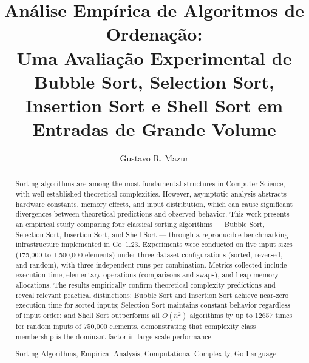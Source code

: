 \documentclass[12pt]{article}
\title{Análise Empírica de Algoritmos de Ordenação:\\
       Uma Avaliação Experimental de Bubble Sort, Selection Sort,\\
       Insertion Sort e Shell Sort em Entradas de Grande Volume}
\author{Gustavo R. Mazur\inst{1}}
\newcommand{\num}[1]{#1}
\begin{document}
\maketitle

\begin{abstract}
Sorting algorithms are among the most fundamental structures in
Computer Science, with well-established theoretical complexities.
However, asymptotic analysis abstracts hardware constants, memory
effects, and input distribution, which can cause significant
divergences between theoretical predictions and observed behavior.
This work presents an empirical study comparing four classical
sorting algorithms — Bubble Sort, Selection Sort, Insertion Sort,
and Shell Sort — through a reproducible benchmarking infrastructure
implemented in Go~1.23. Experiments were conducted on five input
sizes (175,000 to 1,500,000 elements) under three dataset
configurations (sorted, reversed, and random), with three
independent runs per combination. Metrics collected include
execution time, elementary operations (comparisons and swaps),
and heap memory allocations. The results empirically confirm
theoretical complexity predictions and reveal relevant practical
distinctions: Bubble Sort and Insertion Sort achieve near-zero
execution time for sorted inputs; Selection Sort maintains
constant behavior regardless of input order; and Shell Sort
outperforms all $O(n^2)$ algorithms by up to \num{12657} times
for random inputs of 750,000 elements, demonstrating that
complexity class membership is the dominant factor in
large-scale performance.

 Sorting Algorithms, Empirical Analysis, Computational Complexity, Go Language.
\end{abstract}
\end{document}
